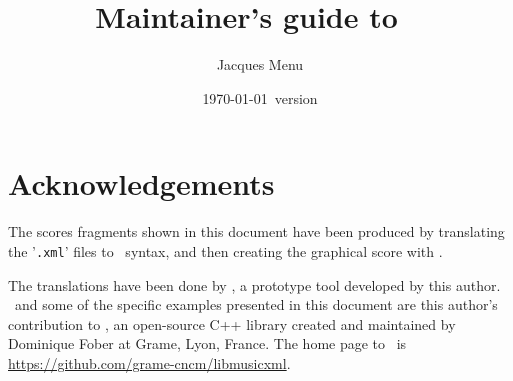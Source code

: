 \documentclass[12pt,a4paper]{article}
\begin{document}


\title{
Maintainer's guide to \xmlToly\ \\[5pt]
}

\newsavebox{\authorBox}

\author{
Jacques Menu 
}

\date {\normalsize \today\ version}

\maketitle


\section{Acknowledgements}

The scores fragments shown in this document have been produced by translating the '{\tt .xml}' files to \lily\ syntax, and then creating the graphical score with \lily. 

The translations have been done by \xmlToly, a prototype tool developed by this author. \xmlToly\ and some of the specific examples presented in this document are this author's contribution to \lib, an open-source C++ library created and maintained by Dominique Fober at Grame, Lyon, France. The home page to \lib\ is \url{https://github.com/grame-cncm/libmusicxml}.
\end{document}
